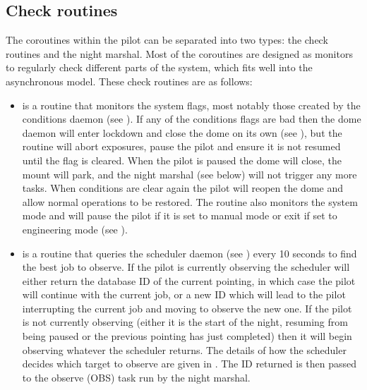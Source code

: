 \subsection{Check routines}
\label{sec:checks}
\begin{colsection}

The coroutines within the pilot can be separated into two types: the check routines and the night marshal. Most of the coroutines are designed as monitors to regularly check different parts of the system, which fits well into the asynchronous model. These check routines are as follows:

\begin{itemize}

\item {} is a routine that monitors the system flags, most notably those created by the conditions daemon (see ). If any of the conditions flags are bad then the dome daemon will enter lockdown and close the dome on its own (see ), but the  routine will abort exposures, pause the pilot and ensure it is not resumed until the flag is cleared. When the pilot is paused the dome will close, the mount will park, and the night marshal (see below) will not trigger any more tasks. When conditions are clear again the pilot will reopen the dome and allow normal operations to be restored. The  routine also monitors the system mode and will pause the pilot if it is set to manual mode or exit if set to engineering mode (see ).

\item {} is a routine that queries the scheduler daemon (see ) every 10 seconds to find the best job to observe. If the pilot is currently observing the scheduler will either return the database ID of the current pointing, in which case the pilot will continue with the current job, or a new ID which will lead to the pilot interrupting the current job and moving to observe the new one. If the pilot is not currently observing (either it is the start of the night, resuming from being paused or the previous pointing has just completed) then it will begin observing whatever the scheduler returns. The details of how the scheduler decides which target to observe are given in . The ID returned is then passed to the observe (OBS) task run by the night marshal.


\end{itemize}
\end{colsection}
